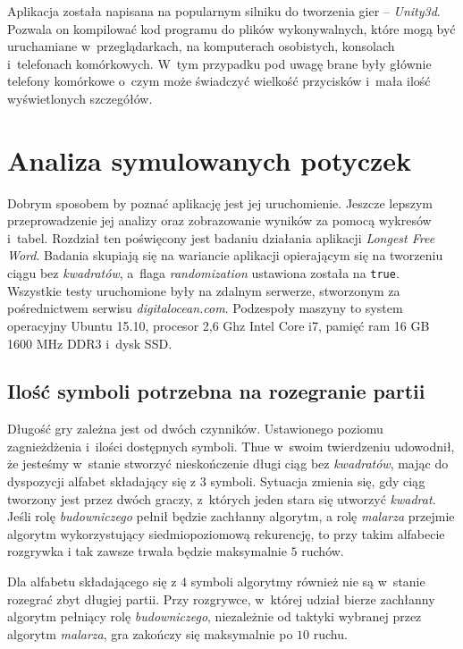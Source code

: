 \documentclass[document]{xmgr}
\begin{document}
Aplikacja została napisana na popularnym silniku do tworzenia gier -- \emph{Unity3d}. Pozwala on kompilować kod programu do plików wykonywalnych, które mogą być uruchamiane w~przeglądarkach, na komputerach osobistych, konsolach i~telefonach komórkowych. W~tym przypadku pod uwagę brane były głównie telefony komórkowe o~czym może świadczyć wielkość przycisków i~mała ilość wyświetlonych szczegółów.


\chapter{Analiza symulowanych potyczek} 
Dobrym sposobem by poznać aplikację jest jej uruchomienie. Jeszcze lepszym przeprowadzenie jej analizy oraz zobrazowanie wyników za pomocą wykresów i~tabel. Rozdział ten poświęcony jest badaniu działania aplikacji \emph{Longest Free Word}. Badania skupiają się na wariancie aplikacji opierającym się na tworzeniu ciągu bez \emph{kwadratów}, a~flaga \emph{randomization} ustawiona została na \texttt{true}. Wszystkie testy uruchomione były na zdalnym serwerze, stworzonym za pośrednictwem serwisu \emph{digitalocean.com}. Podzespoły maszyny to system operacyjny Ubuntu 15.10, procesor 2,6 Ghz Intel Core i7, pamięć ram 16 GB 1600 MHz DDR3 i~dysk SSD.



\section{Ilość symboli potrzebna na rozegranie partii}
Długość gry zależna jest od dwóch czynników. Ustawionego poziomu zagnieżdżenia i~ilości dostępnych symboli. Thue w~swoim twierdzeniu \cite{repetition} udowodnił, że jesteśmy w~stanie stworzyć nieskończenie długi ciąg bez \emph{kwadratów}, mając do dyspozycji alfabet składający się z $3$ symboli. Sytuacja zmienia się, gdy ciąg tworzony jest przez dwóch graczy, z~których jeden stara się utworzyć \emph{kwadrat}. Jeśli  rolę \emph{budowniczego} pełnił będzie zachłanny algorytm, a rolę \emph{malarza} przejmie algorytm wykorzystujący siedmiopoziomową rekurencję, to przy takim alfabecie rozgrywka i tak zawsze trwała będzie maksymalnie $5$ ruchów. 

Dla alfabetu składającego się z $4$ symboli algorytmy również nie są w~stanie rozegrać zbyt długiej partii. Przy rozgrywce, w~której udział bierze zachłanny algorytm pełniący rolę \emph{budowniczego}, niezależnie od taktyki wybranej przez algorytm \emph{malarza}, gra zakończy się maksymalnie po $10$ ruchu.
\end{document}
